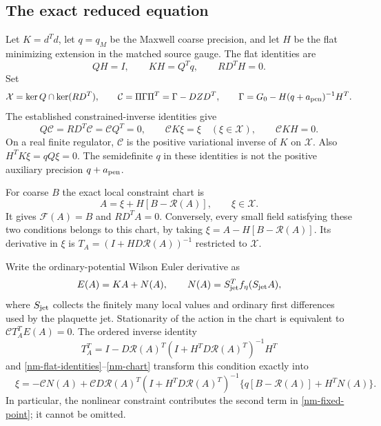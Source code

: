 \documentclass[11pt]{article}
\theoremstyle{remark}\newtheorem{remark}[theorem]{Remark}
\begin{document}
\subsection{The exact reduced equation}
\label{nm-reduction}

Let $K=d^Td$, let $q=q_M$ be the Maxwell coarse precision, and let
$H$ be the flat minimizing extension in the matched source gauge.
The flat identities are
\begin{equation}\label{nm-flat-identities}
 QH=I,\qquad KH=Q^Tq,\qquad RD^TH=0.
\end{equation}
Set
\begin{equation}\label{nm-slice-green}
 \mathcal X=\ker Q\cap\ker(RD^T),\qquad
 \mathcal C=\Pi\Gamma\Pi^T=\Gamma-DZD^T,
 \qquad \Gamma=G_0-H(q+a_{\rm pen})^{-1}H^T.
\end{equation}
The established constrained-inverse identities give
\begin{equation}\label{nm-constrained-identities}
 Q\mathcal C=RD^T\mathcal C=\mathcal C Q^T=0,\qquad
 \mathcal C K\xi=\xi\quad(\xi\in\mathcal X),\qquad
 \mathcal C KH=0.
\end{equation}
On a real finite regulator, $\mathcal C$ is the positive
variational inverse of $K$ on $\mathcal X$. Also
$H^TK\xi=qQ\xi=0$. The semidefinite $q$ in these identities is
not the positive auxiliary precision $q+a_{\rm pen}$.

For coarse $B$ the exact local constraint chart is
\begin{equation}\label{nm-chart}
 A=\xi+H[B-\mathcal R(A)],\qquad \xi\in\mathcal X.
\end{equation}
It gives $\mathcal F(A)=B$ and $RD^TA=0$. Conversely, every small
field satisfying these two conditions belongs to this chart,
by taking $\xi=A-H[B-\mathcal R(A)]$. Its derivative in $\xi$ is
$T_A=(I+HD\mathcal R(A))^{-1}$ restricted to $\mathcal X$.

Write the ordinary-potential Wilson Euler derivative as
\begin{equation}\label{nm-force}
 E(A)=KA+N(A),\qquad N(A)=S_{\rm jet}^Tf_\eta(S_{\rm jet}A),
\end{equation}
where $S_{\rm jet}$ collects the finitely many local values and
ordinary first differences used by the plaquette jet. Stationarity
of the action in the chart is equivalent to
$\mathcal C T_A^TE(A)=0$. The ordered inverse identity
\[
 T_A^T=I-D\mathcal R(A)^T
       (I+H^TD\mathcal R(A)^T)^{-1}H^T
\]
and \eqref{nm-flat-identities}--\eqref{nm-chart} transform this
condition exactly into
\begin{equation}\label{nm-fixed-point}
 \boxed{\quad
 \xi=-\mathcal C N(A)
 +\mathcal C D\mathcal R(A)^T
       (I+H^TD\mathcal R(A)^T)^{-1}
       \{q[B-\mathcal R(A)]+H^TN(A)\}.
 \quad}
\end{equation}
In particular, the nonlinear constraint contributes the second
term in \eqref{nm-fixed-point}; it cannot be omitted.
\end{document}
